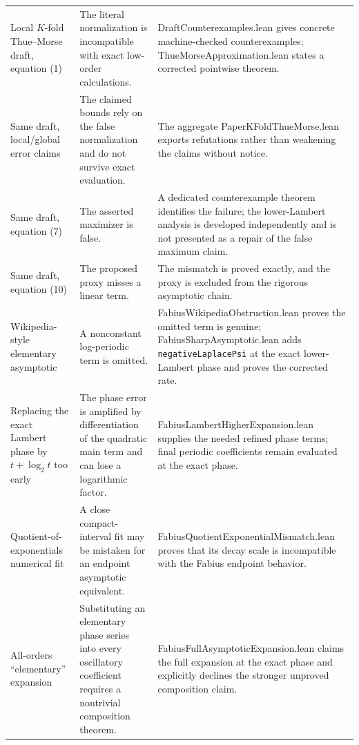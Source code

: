 \documentclass[11pt,a4paper,openany]{book}
\def\module#1{#1.lean}
\newcommand{\module}[1]{\nolinkurl{#1.lean}}
\newcommand{\pathbreak}[1]{\nolinkurl{#1}}
\begin{document}
\begin{longtable}{@{}>{\raggedright\arraybackslash}p{}>{\raggedright\arraybackslash}p{}p{}@{}}
\addlinespace[.35em]
Local $K$-fold Thue--Morse draft, equation (1) & The literal normalization is incompatible with exact low-order calculations. & \module{DraftCounterexamples} gives concrete machine-checked counterexamples; \module{ThueMorseApproximation} states a corrected pointwise theorem. \\
\addlinespace[.35em]
Same draft, local/global error claims & The claimed bounds rely on the false normalization and do not survive exact evaluation. & The aggregate \module{PaperKFoldThueMorse} exports refutations rather than weakening the claims without notice. \\
\addlinespace[.35em]
Same draft, equation (7) & The asserted maximizer is false. & A dedicated counterexample theorem identifies the failure; the lower-Lambert analysis is developed independently and is not presented as a repair of the false maximum claim. \\
\addlinespace[.35em]
Same draft, equation (10) & The proposed proxy misses a linear term. & The mismatch is proved exactly, and the proxy is excluded from the rigorous asymptotic chain. \\
\addlinespace[.35em]
Wikipedia-style elementary asymptotic & A nonconstant log-periodic term is omitted. & \module{FabiusWikipediaObstruction} proves the omitted term is genuine; \module{FabiusSharpAsymptotic} adds \pathbreak{negativeLaplacePsi} at the exact lower-Lambert phase and proves the corrected rate. \\
\addlinespace[.35em]
Replacing the exact Lambert phase by $t+\log_2t$ too early & The phase error is amplified by differentiation of the quadratic main term and can lose a logarithmic factor. & \module{FabiusLambertHigherExpansion} supplies the needed refined phase terms; final periodic coefficients remain evaluated at the exact phase. \\
\addlinespace[.35em]
Quotient-of-exponentials numerical fit & A close compact-interval fit may be mistaken for an endpoint asymptotic equivalent. & \module{FabiusQuotientExponentialMismatch} proves that its decay scale is incompatible with the Fabius endpoint behavior. \\
\addlinespace[.35em]
All-orders ``elementary'' expansion & Substituting an elementary phase series into every oscillatory coefficient requires a nontrivial composition theorem. & \module{FabiusFullAsymptoticExpansion} claims the full expansion at the exact phase and explicitly declines the stronger unproved composition claim. \\
\end{longtable}
\end{document}
